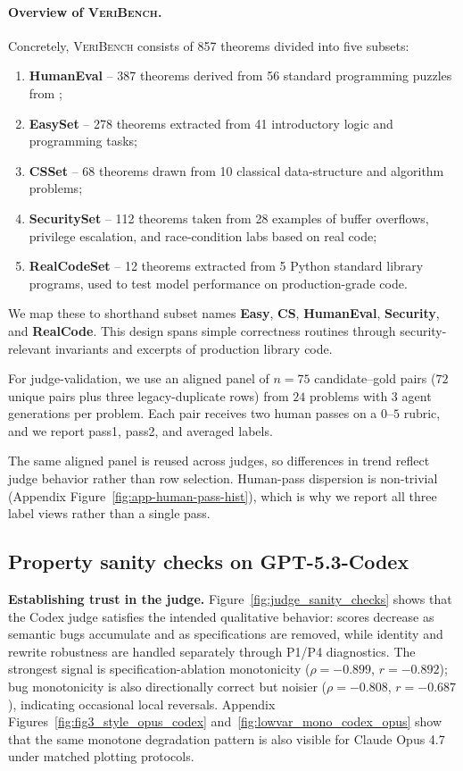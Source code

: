 \documentclass{article}
\begin{document}
\paragraph{Overview of \textsc{VeriBench}.}
Concretely, \textsc{VeriBench} consists of 857 theorems divided into five subsets:
\begin{enumerate}
  \item \textbf{HumanEval} -- 387 theorems derived from 56 standard programming puzzles from \citet{chen2021evaluating};
  \item \textbf{EasySet} -- 278 theorems extracted from 41 introductory logic and programming tasks;
  \item \textbf{CSSet} -- 68 theorems drawn from 10 classical data-structure and algorithm problems;
  \item \textbf{SecuritySet} -- 112 theorems taken from 28 examples of buffer overflows, privilege escalation, and race-condition labs based on real code;
  \item \textbf{RealCodeSet} -- 12 theorems extracted from 5 Python standard library programs, used to test model performance on production-grade code.
\end{enumerate}
We map these to shorthand subset names \textbf{Easy}, \textbf{CS}, \textbf{HumanEval}, \textbf{Security}, and \textbf{RealCode}. This design spans simple correctness routines through security-relevant invariants and excerpts of production library code.

For judge-validation, we use an aligned panel of \(n=75\) candidate--gold pairs (\(72\) unique pairs plus three legacy-duplicate rows) from \(24\) problems with \(3\) agent generations per problem. Each pair receives two human passes on a \(0\)--\(5\) rubric, and we report pass1, pass2, and averaged labels.

The same aligned panel is reused across judges, so differences in trend reflect judge behavior rather than row selection. Human-pass dispersion is non-trivial (Appendix Figure~\ref{fig:app-human-pass-hist}), which is why we report all three label views rather than a single pass.

\subsection{Property sanity checks on GPT-5.3-Codex}
\textbf{Establishing trust in the judge.} Figure~\ref{fig:judge_sanity_checks} shows that the Codex judge satisfies the intended qualitative behavior: scores decrease as semantic bugs accumulate and as specifications are removed, while identity and rewrite robustness are handled separately through P1/P4 diagnostics. The strongest signal is specification-ablation monotonicity (\(\rho=-0.899\), \(r=-0.892\)); bug monotonicity is also directionally correct but noisier (\(\rho=-0.808\), \(r=-0.687\)), indicating occasional local reversals. Appendix Figures~\ref{fig:fig3_style_opus_codex} and~\ref{fig:lowvar_mono_codex_opus} show that the same monotone degradation pattern is also visible for Claude Opus 4.7 under matched plotting protocols.
\end{document}
